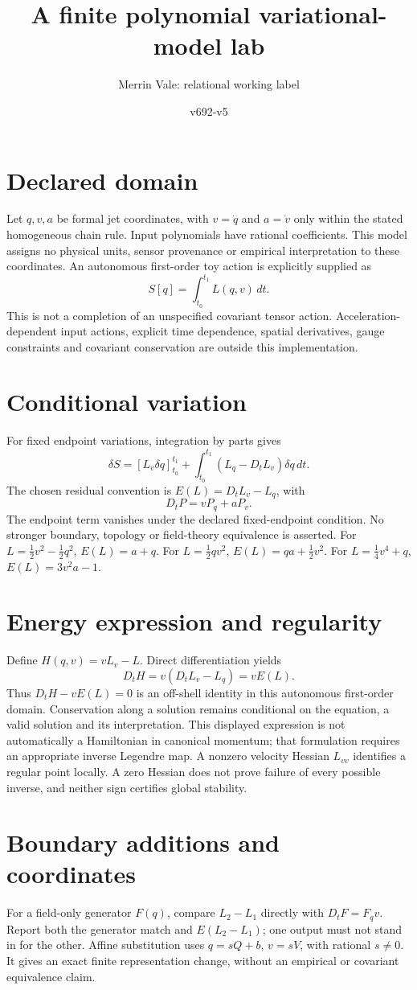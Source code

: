\documentclass[11pt]{article}
\title{A finite polynomial variational-model lab}
\author{Merrin Vale: relational working label}
\date{v692-v5}
\begin{document}
\maketitle
\section{Declared domain}
Let $q,v,a$ be formal jet coordinates, with $v=\dot q$ and $a=\dot v$ only within the stated homogeneous chain rule. Input polynomials have rational coefficients. This model assigns no physical units, sensor provenance or empirical interpretation to these coordinates. An autonomous first-order toy action is explicitly supplied as
\[S[q]=\int_{t_0}^{t_1}L(q,v)\,dt.\]
This is not a completion of an unspecified covariant tensor action. Acceleration-dependent input actions, explicit time dependence, spatial derivatives, gauge constraints and covariant conservation are outside this implementation.
\section{Conditional variation}
For fixed endpoint variations, integration by parts gives
\[\delta S=[L_v\delta q]_{t_0}^{t_1}+\int_{t_0}^{t_1}(L_q-D_tL_v)\delta q\,dt.\]
The chosen residual convention is $E(L)=D_tL_v-L_q$, with
\[D_tP=vP_q+aP_v.\]
The endpoint term vanishes under the declared fixed-endpoint condition. No stronger boundary, topology or field-theory equivalence is asserted.
For $L=\tfrac12v^2-\tfrac12q^2$, $E(L)=a+q$.
For $L=\tfrac12qv^2$, $E(L)=qa+\tfrac12v^2$.
For $L=\tfrac14v^4+q$, $E(L)=3v^2a-1$.
\section{Energy expression and regularity}
Define $H(q,v)=vL_v-L$. Direct differentiation yields
\[D_tH=v(D_tL_v-L_q)=vE(L).\]
Thus $D_tH-vE(L)=0$ is an off-shell identity in this autonomous first-order domain. Conservation along a solution remains conditional on the equation, a valid solution and its interpretation. This displayed expression is not automatically a Hamiltonian in canonical momentum; that formulation requires an appropriate inverse Legendre map. A nonzero velocity Hessian $L_{vv}$ identifies a regular point locally. A zero Hessian does not prove failure of every possible inverse, and neither sign certifies global stability.
\section{Boundary additions and coordinates}
For a field-only generator $F(q)$, compare $L_2-L_1$ directly with $D_tF=F_qv$. Report both the generator match and $E(L_2-L_1)$; one output must not stand in for the other. Affine substitution uses $q=sQ+b$, $v=sV$, with rational $s\ne0$. It gives an exact finite representation change, without an empirical or covariant equivalence claim.
\end{document}
